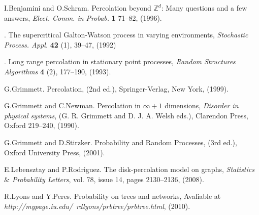 \documentclass[12pt,reqno,oneside]{amsart}
\theoremstyle{plain}
\theoremstyle{definition}
\numberwithin{equation}{section}
\begin{document}
\begin{thebibliography}{99}

{I.Benjamini and O.Schram}.
Percolation beyond ${{\mathbb Z}}^d$: Many questions and a few answers,
\textit{Elect. Comm. in Probab.} 
\textbf{1} 71--82, (1996).

.
The supercritical Galton-Watson process in varying environments, 
\textit{Stochastic Process. Appl.} 
\textbf{42} (1), 39--47, (1992)

.
Long range percolation in stationary point processes,
\textit{Random Structures Algorithms}
\textbf{4} (2), 177--190, (1993).

{G.Grimmett}.
Percolation,
(2nd ed.), Springer-Verlag, New York, (1999).

{G.Grimmett and C.Newman}.
Percolation in $\infty+1$ dimensions,
\textit{Disorder in physical systems}, 
(G. R. Grimmett and D. J. A. Welsh eds.), 
Clarendon Press, Oxford
219--240, (1990).

{G.Grimmett and D.Stirzker}.
Probability and Random Processes,
(3rd ed.), Oxford University Press, (2001).

{E.Lebensztay and P.Rodriguez}.
The disk-percolation model on graphs,
\textit{Statistics $\&$ Probability Letters},
vol. 78, issue 14, pages 2130--2136, (2008).

{R.Lyons and Y.Peres}.
Probability on trees and networks,
Avaliable at
\textit{http://mypage.iu.edu/~rdlyons/prbtree/prbtree.html}, (2010).

\end{thebibliography}
\end{document}
